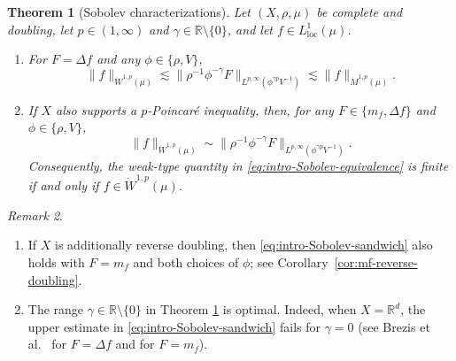 \documentclass[11pt]{amsart}
\newtheorem{theorem}{Theorem}[section]
\theoremstyle{definition}
\theoremstyle{remark}
\newtheorem{remark}[theorem]{Remark}
\numberwithin{equation}{section}
\begin{document}
\begin{theorem}[Sobolev characterizations]\label{thm:intro-Sobolev}
Let $(X,\rho,\mu)$ be complete and doubling, let $p\in(1,\infty)$ and
$\gamma\in\mathbb R\setminus\{0\}$, and let $f\in L^1_{\mathrm{loc}}(\mu)$.
\begin{enumerate}[\rm(i)]
\item For $F=\Delta f$ and any $\phi\in\{\rho,V\}$,
\begin{equation}\label{eq:intro-Sobolev-sandwich}
 \|f\|_{\dot W^{1,p}(\mu)}
 \lesssim
 \|\rho^{-1}\phi^{-\gamma}F\|_
 {L^{p,\infty}(\phi^{\gamma p}V^{-1})}
 \lesssim \|f\|_{\dot M^{1,p}(\mu)}.
 \end{equation}
\item If $X$ also supports a $p$-Poincar\'e inequality, then, for any
$F\in\{m_f,\Delta f\}$ and $\phi\in\{\rho,V\}$,
\begin{equation}\label{eq:intro-Sobolev-equivalence}
 \|f\|_{\dot W^{1,p}(\mu)}
 \sim
 \|\rho^{-1}\phi^{-\gamma}F\|_
 {L^{p,\infty}(\phi^{\gamma p}V^{-1})}.
\end{equation}
Consequently, the weak-type quantity in
\eqref{eq:intro-Sobolev-equivalence} is finite if and only if $f\in
\dot W^{1,p}(\mu)$.
\end{enumerate}
\end{theorem}

\begin{remark}
\begin{enumerate}[\rm(i)]
\item If $X$ is additionally reverse doubling, then
\eqref{eq:intro-Sobolev-sandwich} also holds with $F=m_f$ and both choices of
$\phi$; see Corollary~\ref{cor:mf-reverse-doubling}.
\item The range $\gamma\in\mathbb R\setminus\{0\}$ in Theorem
\ref{thm:intro-Sobolev} is optimal. Indeed, when $X=\mathbb R^d$, the upper
estimate in \eqref{eq:intro-Sobolev-sandwich}
fails for $\gamma=0$ (see Brezis et al.\
\cite[Theorem 1.3(i)]{BSVY} for $F=\Delta f$
and \cite[Remark 1.4(ii)]{ZLYYZ24} for $F=m_f$).
\end{enumerate}
\end{remark}
\end{document}
